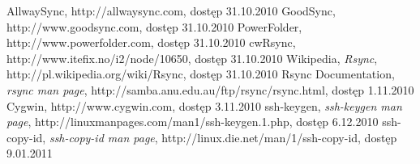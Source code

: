 \begin{thebibliography}{9}
   AllwaySync, http://allwaysync.com, dostęp 31.10.2010
   GoodSync, http://www.goodsync.com, dostęp 31.10.2010
   PowerFolder, http://www.powerfolder.com, dostęp 31.10.2010
   cwRsync, http://www.itefix.no/i2/node/10650, dostęp 31.10.2010
   Wikipedia, \textit{Rsync}, http://pl.wikipedia.org/wiki/Rsync, dostęp 31.10.2010
   Rsync Documentation, \textit{rsync man page}, http://samba.anu.edu.au/ftp/rsync/rsync.html, dostęp 1.11.2010
   Cygwin, http://www.cygwin.com, dostęp 3.11.2010
   ssh-keygen, \textit{ssh-keygen man page}, http://linuxmanpages.com/man1/ssh-keygen.1.php, dostęp 6.12.2010
   ssh-copy-id, \textit{ssh-copy-id man page}, http://linux.die.net/man/1/ssh-copy-id, dostęp 9.01.2011

\end{thebibliography} 

